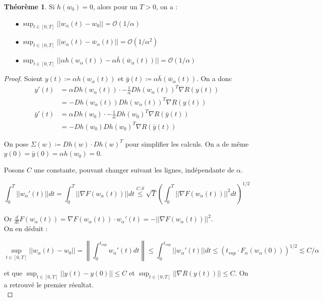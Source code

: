 \documentclass[a4paper, 11pt, french]{article}
\theoremstyle{definition}
\newtheorem{theorem}{Théorème}
\newcommand{\norm}[1]{\left\lVert#1\right\rVert}
\begin{document}
\begin{theorem}
	Si $h(w_0) = 0$, alors pour un $T > 0$, on a :
	\begin{itemize}
		\item[$\bullet$] $\sup_{t \in [0, T]} ||w_{\alpha}(t) - w_0|| = \mathcal{O}(1 / \alpha)$
		\item[$\bullet$] $\sup_{t \in [0, T]} ||w_{\alpha}(t) - \bar{w}_{\alpha}(t)|| = \mathcal{O}(1 / \alpha^2)$
		\item[$\bullet$] $\sup_{t \in [0, T]} ||\alpha h(w_{\alpha}(t)) - \alpha \bar{h}(\bar{w}_{\alpha}(t))|| = \mathcal{O}(1 / \alpha)$
	\end{itemize}
\end{theorem}
\begin{proof}
	Soient $y(t) \coloneqq \alpha h(w_{\alpha}(t))$ et $\bar{y}(t) \coloneqq \alpha \bar{h}(\bar{w}_{\alpha}(t))$. On a donc 
	\begin{align*}
		y'(t) &= \alpha Dh(w_{\alpha}(t)) \cdot - \frac{1}{\alpha} Dh (w_{\alpha}(t))^T \nabla R (y(t)) \\
		&= - Dh(w_{\alpha}(t)) Dh (w_{\alpha}(t))^T \nabla R(y(t)) \\
		\bar{y}'(t) &= \alpha Dh(w_0) \cdot - \frac{1}{\alpha} Dh (w_0)^T \nabla R(\bar{y}(t)) \\
		&= - Dh(w_0)Dh (w_0)^T \nabla R (\bar{y}(t))
	\end{align*}
	
	On pose $\Sigma (w) \coloneqq Dh(w) \cdot Dh (w)^T$ pour simplifier les calculs. On a de même $y(0) = \bar{y}(0) = \alpha h(w_0) = 0$.
	
	Posons $C$ une constante, pouvant changer suivant les lignes, indépendante de $\alpha$.
	
	\[\int_0^T ||w_{\alpha}'(t)|| dt = \int_0^T ||\nabla F(w_{\alpha}(t))|| dt \stackrel{C.S}{\leq} \sqrt{T} \left( \int_0^T ||\nabla F(w_{\alpha}(t))||^2 dt \right)^{1/2} \] \\
	
	Or $\frac{d}{dt} F(w_{\alpha}(t)) = \nabla F(w_{\alpha}(t)) \cdot w_{\alpha}'(t) = -||\nabla F(w_{\alpha}(t))||^2$. \\
	
	On en déduit :
	
	\[\sup_{t \in [0, T]} ||w_{\alpha}(t) - w_0|| = \norm{\int_0^{t_{sup}} w_{\alpha}'(t) dt}  \leq \int_0^{t_{sup}} ||w_{\alpha}'(t)|| dt \leq (t_{sup} \cdot F_{\alpha}(w_{\alpha}(0)))^{1/2} \lesssim C / \alpha\]
	
	et que $\sup_{t \in [0, T]} ||y(t) - y(0)|| \leq C$ et $\sup_{t \in [0, T]} ||\nabla R(y(t))|| \leq C$. On a retrouvé le premier résultat. \\
	

\end{proof}
\end{document}
